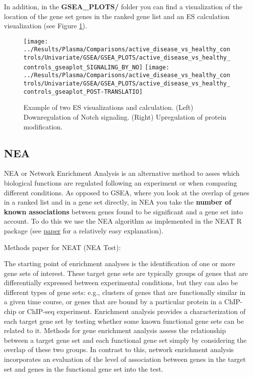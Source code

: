 \documentclass[
]{book}
\begin{document}
In addition, in the \textbf{GSEA\_PLOTS/} folder you can find a visualization of the location of the gene set genes in the ranked gene list and an ES calculation visualization (see Figure \ref{fig:gseaNes}).

\begin{figure}

{\centering \texttt{[image: ../Results/Plasma/Comparisons/active\_disease\_vs\_healthy\_controls/Univariate/GSEA/GSEA\_PLOTS/active\_disease\_vs\_healthy\_controls\_gseaplot\_SIGNALING\_BY\_NO]} \texttt{[image: ../Results/Plasma/Comparisons/active\_disease\_vs\_healthy\_controls/Univariate/GSEA/GSEA\_PLOTS/active\_disease\_vs\_healthy\_controls\_gseaplot\_POST-TRANSLATIO]} 

}

\caption{Example of two ES visualizations and calculation. (Left) Downregulation of Notch signaling. (Right) Upregulation of protein modification.}\label{fig:gseaNes}
\end{figure}

\hypertarget{nea}{%
\subsection{NEA}\label{nea}}

NEA or Network Enrichment Analysis is an alternative method to asses which biological functions are regulated following an experiment or when comparing different conditions. As opposed to GSEA, where you look at the overlap of genes in a ranked list and in a gene set directly, in NEA you take the \textbf{number of known associations} between genes found to be significant and a gene set into account. To do this we use the NEA algorithm as implemented in the NEAT R package (see \href{https://bmcbioinformatics.biomedcentral.com/articles/10.1186/s12859-016-1203-6}{paper} for a relatively easy explanation).

Methods paper for NEAT (NEA Test):

The starting point of enrichment analyses is the identification of one or more gene sets of interest. These target gene sets are typically groups of genes that are differentially expressed between experimental conditions, but they can also be different types of gene sets: e.g., clusters of genes that are functionally similar in a given time course, or genes that are bound by a particular protein in a ChIP-chip or ChIP-seq experiment. Enrichment analysis provides a characterization of each target gene set by testing whether some known functional gene sets can be related to it. Methods for gene enrichment analysis assess the relationship between a target gene set and each functional gene set simply by considering the overlap of these two groups. In contrast to this, network enrichment analysis incorporates an evaluation of the level of association between genes in the target set and genes in the functional gene set into the test.
\end{document}
